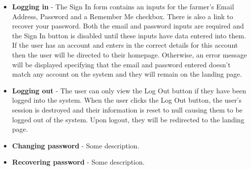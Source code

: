 \documentclass[11pt,fleqn]{book} %
\begin{document}
\begin{itemize}
			\item\textbf{Logging in} -
			The Sign In form contains an inputs for the farmer's Email Address, Password and a Remember Me checkbox. There is also a link to recover your password. Both the email and password inputs are required and the Sign In button is disabled until these inputs have data entered into them. If the user has an account and enters in the correct details for this account then the user will be directed to their homepage. Otherwise, an error message will be displayed specifying that the email and password entered doesn't match any account on the system and they will remain on the landing page.
			
			\item\textbf{Logging out} -
			The user can only view the Log Out button if they have been logged into the system. When the user clicks the Log Out button, the user's session is destroyed and their information is reset to null causing them to be logged out of the system. Upon logout, they will be redirected to the landing page.
			
			\item\textbf{Changing password} -
			Some description.
			
			\item\textbf{Recovering password} -
			Some description.
		\end{itemize}
\end{document}
